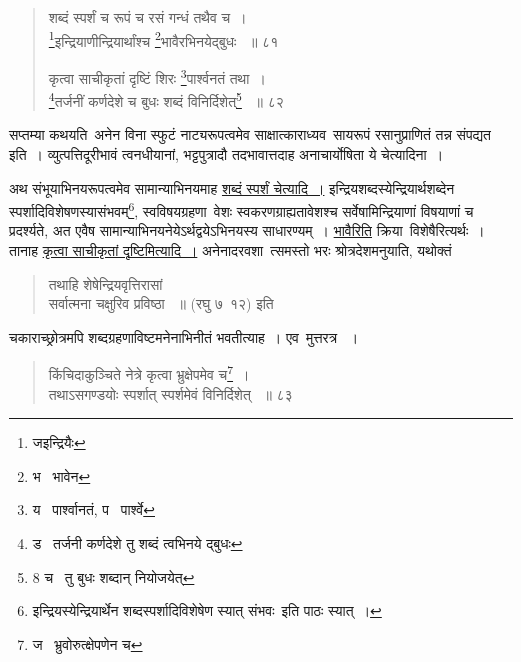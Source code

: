 \documentclass[11pt, openany]{book}
\begin{document}
{\begin{quote}
{शब्दं स्पर्शं च रूपं च रसं गन्धं तथैव च~।\\ 
\renewcommand{\thefootnote}{4}\footnote{जइन्द्रियैः}इन्द्रियाणीन्द्रियार्थांश्च \renewcommand{\thefootnote}{5}\footnote{भ \textendash\ भावेन }भावैरभिनयेद्बुधः ~॥ ८१ 

कृत्वा साचीकृतां दृष्टिं शिरः \renewcommand{\thefootnote}{6}\footnote{य \textendash\ पार्श्वानतं, प \textendash\ पार्श्वे }पार्श्वनतं तथा~। \\
\renewcommand{\thefootnote}{7}\footnote{ड \textendash\ तर्जनी कर्णदेशे तु शब्दं त्वभिनये द्बुधः }तर्जनीं कर्णदेशे च बुधः शब्दं विनिर्दिशेत्\renewcommand{\thefootnote}{8}\footnote{8 च \textendash\ तु बुधः शब्दान् नियोजयेत् } ~॥ ८२ }
\end{quote}

\noindent
सप्तम्या कथयति\textendash\ अनेन विना स्फुटं नाट्यरूपत्वमेव साक्षात्काराध्यव\textendash\ सायरूपं रसानुप्राणितं तन्न संपद्यत इति~। व्युत्पत्तिदूरीभावं त्वनधीयानां, भट्टपुत्रादौ तदभावात्तदाह अनाचार्योषिता ये चेत्यादिना~। \\

\begin{sloppypar}
अथ संभूयाभिनयरूपत्वमेव सामान्याभिनयमाह \underline{शब्दं स्पर्शं चेत्यादि~।} इन्द्रियशब्दस्येन्द्रियार्थशब्देन स्पर्शादिविशेषणस्यासंभवम्\renewcommand{\thefootnote}{*}\footnote{इन्द्रियस्येन्द्रियार्थेन शब्दस्पर्शादिविशेषेण स्यात् संभवः\textendash\ इति पाठः स्यात्~। }, स्वविषयग्रहणा\textendash\ वेशः स्वकरणग्राह्यतावेशश्च सर्वेषामिन्द्रियाणां विषयाणां च प्रदर्श्यते, अत एवैष सामान्याभिनयनेयेऽर्थद्वयेऽभिनयस्य साधारण्यम्~। \underline{भावैरिति} क्रिया\textendash\ विशेषैरित्यर्थः~। तानाह \underline{कृत्वा साचीकृतां दृष्टिमित्यादि~।} अनेनादरवशा\textendash\ त्समस्तो भरः श्रोत्रदेशमनुयाति, यथोक्तं\textendash\ 
\end{sloppypar}


\begin{quote}
 {\qt तथाहि शेषेन्द्रियवृत्तिरासां \\
सर्वात्मना चक्षुरिव प्रविष्ठा ~॥ (रघु ७\textendash\ १२) इति}
\end{quote} 
 
चकाराच्छ्रोत्रमपि शब्दग्रहणाविष्टमनेनाभिनीतं भवतीत्याह~। एव\textendash\ मुत्तरत्र ~। 

\newpage

\begin{quote}
 {\na किंचिदाकुञ्चिते नेत्रे कृत्वा भ्रुक्षेपमेव च\renewcommand{\thefootnote}{1}\footnote{ज \textendash\ भ्रुवोरुत्क्षेपणेन च}~। \\
तथाऽसगण्डयोः स्पर्शात् स्पर्शमेवं विनिर्दिशेत् ~॥ ८३

}
\end{quote}}
\end{document}
